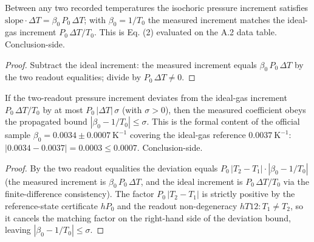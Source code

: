 \begin{theorem}
\label{thm:IPhO2026Problems_problem_IPhO_2026_4_A_5:beta0_eq_ideal_of_linear}
Between any two recorded temperatures the isochoric pressure increment
satisfies $\mathrm{slope}\cdot\Delta T = \beta_0\,P_0\,\Delta T$; with
$\beta_0 = 1/T_0$ the measured increment matches the ideal-gas increment
$P_0\,\Delta T/T_0$.  This is Eq. (2) evaluated on the A.2 data table.
Conclusion-side.
\end{theorem}
\begin{proof}
Subtract the ideal increment: the measured increment equals
$\beta_0\,P_0\,\Delta T$ by the two readout equalities; divide by
$P_0\,\Delta T \neq 0$.
\end{proof}

\begin{theorem}
\label{thm:IPhO2026Problems_problem_IPhO_2026_4_A_5:beta0_uncertainty_bound}
If the two-readout pressure increment deviates from the ideal-gas
increment $P_0\,\Delta T/T_0$ by at most $P_0\,|\Delta T|\,\sigma$
(with $\sigma > 0$), then the measured coefficient obeys the propagated
bound $|\beta_0 - 1/T_0| \le \sigma$.  This is the formal content of the
official sample $\beta_0 = 0.0034 \pm 0.0007\ \mathrm{K^{-1}}$ covering
the ideal-gas reference $0.0037\ \mathrm{K^{-1}}$:
$|0.0034 - 0.0037| = 0.0003 \le 0.0007$.  Conclusion-side.
\end{theorem}
\begin{proof}
By the two readout equalities the deviation equals
$P_0\,|T_2 - T_1|\cdot|\beta_0 - 1/T_0|$ (the measured increment is
$\beta_0\,P_0\,\Delta T$, and the ideal increment is $P_0\,\Delta T/T_0$
via the finite-difference consistency).  The factor
$P_0\,|T_2 - T_1|$ is strictly positive by the reference-state
certificate $hP_0$ and the readout non-degeneracy $hT12 : T_1 \ne T_2$,
so it cancels the matching factor on the right-hand side of the deviation
bound, leaving $|\beta_0 - 1/T_0| \le \sigma$.
\end{proof}

